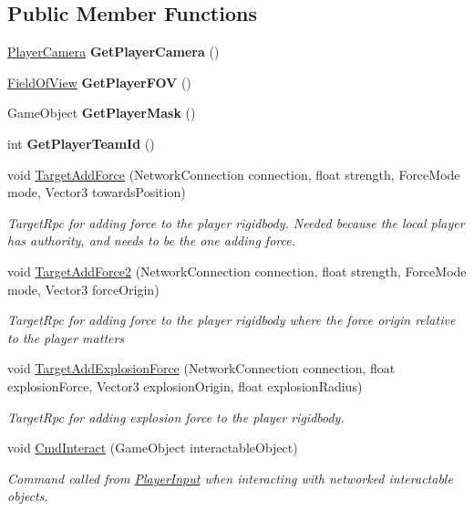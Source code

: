 \subsection*{Public Member Functions}
\begin{DoxyCompactItemize}
\item 
\hypertarget{class_player_a585d67554725b321ac1ea8ac59c1d996}{}\label{class_player_a585d67554725b321ac1ea8ac59c1d996} 
\hyperlink{class_player_camera}{Player\+Camera} {\bfseries Get\+Player\+Camera} ()
\item 
\hypertarget{class_player_af06bd71da0900cd98ebff8747b7bd213}{}\label{class_player_af06bd71da0900cd98ebff8747b7bd213} 
\hyperlink{class_field_of_view}{Field\+Of\+View} {\bfseries Get\+Player\+F\+OV} ()
\item 
\hypertarget{class_player_aa521f4478333ad9b5138200b65d3e72e}{}\label{class_player_aa521f4478333ad9b5138200b65d3e72e} 
Game\+Object {\bfseries Get\+Player\+Mask} ()
\item 
\hypertarget{class_player_aa8a94c91b9d650ab2a84a474c268c06e}{}\label{class_player_aa8a94c91b9d650ab2a84a474c268c06e} 
int {\bfseries Get\+Player\+Team\+Id} ()
\item 
void \hyperlink{class_player_a280fba8a60370ab21efc7d628b91106f}{Target\+Add\+Force} (Network\+Connection connection, float strength, Force\+Mode mode, Vector3 towards\+Position)
\begin{DoxyCompactList}\small\item\em Target\+Rpc for adding force to the player rigidbody. Needed because the local player has authority, and needs to be the one adding force. \end{DoxyCompactList}\item 
void \hyperlink{class_player_ae4ab7842376ea3aad0970c2ba0266279}{Target\+Add\+Force2} (Network\+Connection connection, float strength, Force\+Mode mode, Vector3 force\+Origin)
\begin{DoxyCompactList}\small\item\em Target\+Rpc for adding force to the player rigidbody where the force origin relative to the player matters \end{DoxyCompactList}\item 
void \hyperlink{class_player_a07aadf55bd27c3165d4c4e699b95f396}{Target\+Add\+Explosion\+Force} (Network\+Connection connection, float explosion\+Force, Vector3 explosion\+Origin, float explosion\+Radius)
\begin{DoxyCompactList}\small\item\em Target\+Rpc for adding explosion force to the player rigidbody. \end{DoxyCompactList}\item 
void \hyperlink{class_player_a53cf43e4835276f4a24c3004b36265c7}{Cmd\+Interact} (Game\+Object interactable\+Object)
\begin{DoxyCompactList}\small\item\em Command called from \hyperlink{class_player_input}{Player\+Input} when interacting with networked interactable objects. \end{DoxyCompactList}\end{DoxyCompactItemize}
